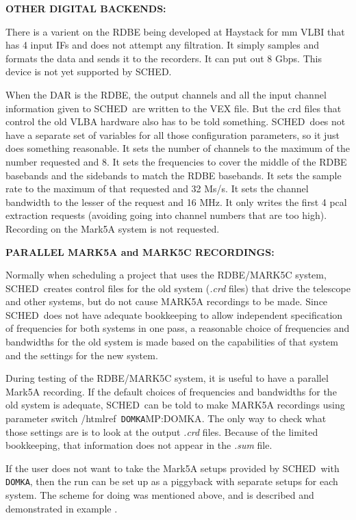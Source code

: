 \documentclass{report}
\newcommand{\schedb}{{\sc SCHED~}}
\begin{document}
{\bf OTHER DIGITAL BACKENDS:}

There is a varient on the RDBE being developed at Haystack for mm VLBI
that has 4 input IFs and does not attempt any filtration.  It simply
samples and formats the data and sends it to the recorders.  It can
put out 8 Gbps.  This device is not yet supported by SCHED.

When the DAR is the RDBE, the output channels and all the input
channel information given to \schedb are written to the VEX file.  But
the crd files that control the old VLBA hardware also has to be told
something.  \schedb does not have a separate set of variables for all
those configuration parameters, so it just does something reasonable.
It sets the number of channels to the maximum of the number requested
and 8.  It sets the frequencies to cover the middle of the RDBE
basebands and the sidebands to match the RDBE basebands.  It sets the
sample rate to the maximum of that requested and 32 Ms/s.  It sets the
channel bandwidth to the lesser of the request and 16 MHz.  It only
writes the first 4 pcal extraction requests (avoiding going into
channel numbers that are too high).  Recording on the Mark5A system
is not requested.

{\bf PARALLEL MARK5A and MARK5C RECORDINGS:}

Normally when scheduling a project that uses the RDBE/MARK5C system,
\schedb creates control files for the old system ({\sl .crd} files)
that drive the telescope and other systems, but do not cause MARK5A
recordings to be made.  Since \schedb does not have adequate bookkeeping
to allow independent specification of frequencies for both systems
in one pass, a reasonable choice of frequencies and bandwidths for 
the old system is made based on the capabilities of that system and
the settings for the new system.  

During testing of the RDBE/MARK5C system, it is useful to have a
parallel Mark5A recording.  If the default choices of frequencies and
bandwidths for the old system is adequate, \schedb can be told to make
MARK5A recordings using parameter switch /htmlref{{\tt
DOMKA}}{MP:DOMKA}.  The only way to check what those settings are is
to look at the output {\sl .crd} files.  Because of the limited 
bookkeeping, that information does not appear in the {\sl .sum} file.

If the user does not want to take the Mark5A setups provided by
\schedb with {\tt DOMKA}, then the run can be set up as a piggyback
with separate setups for each system.  The scheme for doing was 
mentioned above, and is described and demonstrated in example
.
\end{document}
